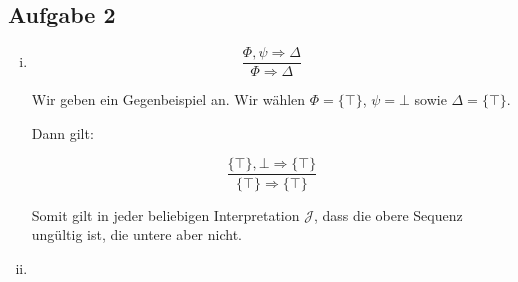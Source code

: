 \documentclass[a4paper,10pt]{article}
\begin{document}
\subsection*{Aufgabe 2}
\begin{enumerate}[(i)]
\item
$$\frac{\Phi, \psi \Rightarrow \Delta}{\Phi \Rightarrow \Delta}$$

Wir geben ein Gegenbeispiel an. Wir wählen $\Phi = \{\top\}$, $\psi = \bot$ sowie $\Delta = \{\top\}$. 

Dann gilt:

$$\frac{\{\top\}, \bot \Rightarrow \{\top\}}{\{\top\} \Rightarrow \{\top\}}$$

Somit gilt in jeder beliebigen Interpretation $\mathcal{J}$, dass die obere Sequenz ungültig ist, die untere aber nicht.
\item
\end{enumerate}
	
\end{document}
